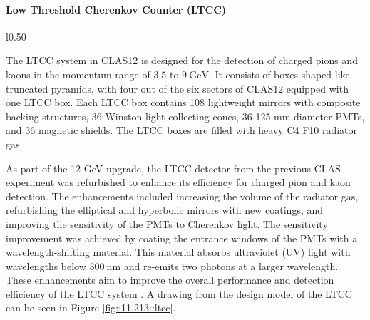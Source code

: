 \paragraph{Low Threshold Cherenkov Counter (LTCC)}
    \begin{wrapfigure}{l}{0.50\textwidth}
        \centering{}
        \caption[LTCC Mirror System]{Layout and components of the optical mirror system within each LTCC box from the design model.
        Source: \hyperlink{jlab.org/physics/hall-b/clas12}{CLAS12 wiki}.}
        \label{fig::11.213::ltcc}
    \end{wrapfigure}

    The LTCC system in CLAS12 is designed for the detection of charged pions and kaons in the momentum range of $3.5$ to $9 ~\text{GeV}$.
    It consists of boxes shaped like truncated pyramids, with four out of the six sectors of CLAS12 equipped with one LTCC box.
    Each LTCC box contains 108 lightweight mirrors with composite backing structures, 36 Winston light-collecting cones, 36 125-mm diameter PMTs, and 36 magnetic shields.
    The LTCC boxes are filled with heavy C4 F10 radiator gas.

    As part of the 12 GeV upgrade, the LTCC detector from the previous CLAS experiment was refurbished to enhance its efficiency for charged pion and kaon detection.
    The enhancements included increasing the volume of the radiator gas, refurbishing the elliptical and hyperbolic mirrors with new coatings, and improving the sensitivity of the PMTs to Cherenkov light.
    The sensitivity improvement was achieved by coating the entrance windows of the PMTs with a wavelength-shifting material.
    This material absorbs ultraviolet (UV) light with wavelengths below $300 ~\text{nm}$ and re-emits two photons at a larger wavelength.
    These enhancements aim to improve the overall performance and detection efficiency of the LTCC system \cite{ungaro2020}.
    A drawing from the design model of the LTCC can be seen in Figure \ref{fig::11.213::ltcc}.

